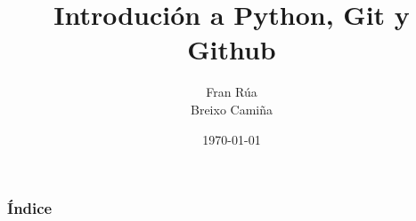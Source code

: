 \documentclass[12pt]{beamer}
\title{Introdución a Python, Git y Github}
\author[Fran Rúa/Breixo Camiña]{Fran Rúa \\ Breixo Camiña}
\institute[GPUL-Labs]{Grupo de Programadores e Usuarios Linux}
\date{\today}
\begin{document}
\begin{frame}
  \titlepage
\end{frame}

\begin{frame}
  \frametitle{Índice}
  \tableofcontents
\end{frame}


\end{document}
